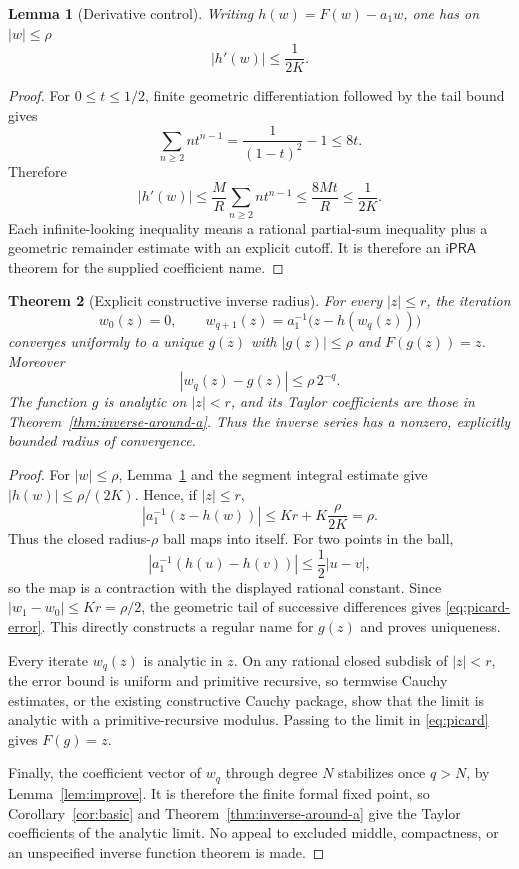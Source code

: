 \documentclass[11pt]{article}
\newtheorem{theorem}{Theorem}[section]
\newtheorem{lemma}[theorem]{Lemma}
\theoremstyle{definition}
\newcommand{\ipra}{\mathsf{iPRA}}
\begin{document}
\begin{lemma}[Derivative control]\label{lem:derivative-control}
Writing \(h(w)=F(w)-a_1w\), one has on \(|w|\le\rho\)
\[
 |h'(w)|\le\frac1{2K}.
\]
\end{lemma}
\begin{proof}
For \(0\le t\le1/2\), finite geometric differentiation followed by the tail
bound gives
\[
 \sum_{n\ge2}nt^{n-1}=\frac1{(1-t)^2}-1\le8t.
\]
Therefore
\[
 |h'(w)|
 \le\frac{M}{R}\sum_{n\ge2}nt^{n-1}
 \le\frac{8Mt}{R}\le\frac1{2K}.
\]
Each infinite-looking inequality means a rational partial-sum inequality plus
a geometric remainder estimate with an explicit cutoff.  It is therefore an
\(\ipra\) theorem for the supplied coefficient name.
\end{proof}

\begin{theorem}[Explicit constructive inverse radius]\label{thm:quant-inverse}
For every \(|z|\le r\), the iteration
\begin{equation}\label{eq:picard}
 w_0(z)=0,
 \qquad w_{q+1}(z)=a_1^{-1}\bigl(z-h(w_q(z))\bigr)
\end{equation}
converges uniformly to a unique \(g(z)\) with \(|g(z)|\le\rho\) and
\(F(g(z))=z\).  Moreover
\begin{equation}\label{eq:picard-error}
 |w_q(z)-g(z)|\le\rho\,2^{-q}.
\end{equation}
The function \(g\) is analytic on \(|z|<r\), and its Taylor coefficients are
those in Theorem~\ref{thm:inverse-around-a}.  Thus the inverse series has a
nonzero, explicitly bounded radius of convergence.
\end{theorem}
\begin{proof}
For \(|w|\le\rho\), Lemma~\ref{lem:derivative-control} and the segment integral
estimate give \(|h(w)|\le\rho/(2K)\).  Hence, if \(|z|\le r\),
\[
 \left|a_1^{-1}(z-h(w))\right|
 \le K r+K\frac{\rho}{2K}=\rho.
\]
Thus the closed radius-\(\rho\) ball maps into itself.  For two points in the
ball,
\[
 \left|a_1^{-1}(h(u)-h(v))\right|\le\frac12|u-v|,
\]
so the map is a contraction with the displayed rational constant.  Since
\(|w_1-w_0|\le Kr=\rho/2\), the geometric tail of successive differences gives
\eqref{eq:picard-error}.  This directly constructs a regular name for \(g(z)\)
and proves uniqueness.

Every iterate \(w_q(z)\) is analytic in \(z\).  On any rational closed subdisk
of \(|z|<r\), the error bound is uniform and primitive recursive, so termwise
Cauchy estimates, or the existing constructive Cauchy package, show that the
limit is analytic with a primitive-recursive modulus.  Passing to the limit in
\eqref{eq:picard} gives \(F(g)=z\).

Finally, the coefficient vector of \(w_q\) through degree \(N\) stabilizes once
\(q>N\), by Lemma~\ref{lem:improve}.  It is therefore the finite formal fixed
point, so Corollary~\ref{cor:basic} and
Theorem~\ref{thm:inverse-around-a} give the Taylor coefficients of the analytic
limit.  No appeal to excluded middle, compactness, or an unspecified inverse
function theorem is made.
\end{proof}
\end{document}
